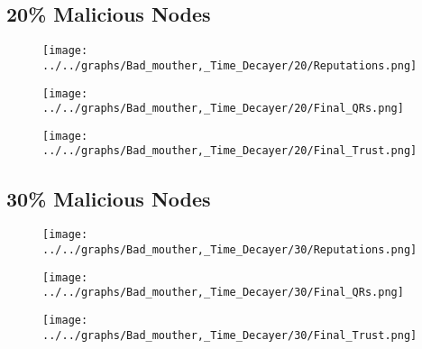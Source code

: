 \begin{minipage}[t]{0.49\columnwidth}
\subsection*{20\% Malicious Nodes}
    \begin{figure}[H]
        \centering
        \texttt{[image: ../../graphs/Bad\_mouther,\_Time\_Decayer/20/Reputations.png]}
    \end{figure}
    \begin{figure}[H]
        \centering
        \texttt{[image: ../../graphs/Bad\_mouther,\_Time\_Decayer/20/Final\_QRs.png]}
    \end{figure}
\end{minipage}
\begin{minipage}[t]{0.49\columnwidth}
    \begin{figure}[H]
        \centering
        \texttt{[image: ../../graphs/Bad\_mouther,\_Time\_Decayer/20/Final\_Trust.png]}
    \end{figure}
\end{minipage}

\begin{minipage}[t]{0.49\columnwidth}
\subsection*{30\% Malicious Nodes}
    \begin{figure}[H]
        \centering
        \texttt{[image: ../../graphs/Bad\_mouther,\_Time\_Decayer/30/Reputations.png]}
    \end{figure}
    \begin{figure}[H]
        \centering
        \texttt{[image: ../../graphs/Bad\_mouther,\_Time\_Decayer/30/Final\_QRs.png]}
    \end{figure}
\end{minipage}
\begin{minipage}[t]{0.49\columnwidth}
    \begin{figure}[H]
        \centering
        \texttt{[image: ../../graphs/Bad\_mouther,\_Time\_Decayer/30/Final\_Trust.png]}
    \end{figure}
\end{minipage}


